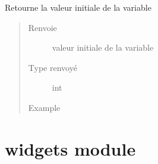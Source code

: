 \documentclass[letterpaper,10pt,french]{sphinxmanual}
\begin{document}
\begin{fulllineitems}

\begin{fulllineitems}
\label{\detokenize{variable:variable.Variable.value}}
Retourne la valeur initiale de la variable
\begin{quote}\begin{description}
\item[{Renvoie}] \leavevmode
valeur initiale de la variable

\item[{Type renvoyé}] \leavevmode
int

\item[{Example}] \leavevmode
\begin{sphinxVerbatim}[commandchars=\\\{\}]
\end{sphinxVerbatim}

\begin{sphinxVerbatim}[commandchars=\\\{\}]
\end{sphinxVerbatim}

\end{description}\end{quote}

\end{fulllineitems}


\end{fulllineitems}



\section{widgets module}
\label{\detokenize{widgets:module-widgets}}\label{\detokenize{widgets:widgets-module}}\label{\detokenize{widgets::doc}}\label{\detokenize{widgets:module-widgets}}
\end{document}
